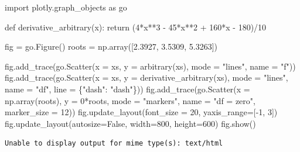 \documentclass[
  letterpaper,
  DIV=11,
  numbers=noendperiod]{scrreprt}
\newenvironment{Shaded}{\begin{snugshade}}{\end{snugshade}}
\newcommand{\ControlFlowTok}[1]{\textcolor[rgb]{0.00,0.23,0.31}{#1}}
\newcommand{\DecValTok}[1]{\textcolor[rgb]{0.68,0.00,0.00}{#1}}
\newcommand{\FloatTok}[1]{\textcolor[rgb]{0.68,0.00,0.00}{#1}}
\newcommand{\ImportTok}[1]{\textcolor[rgb]{0.00,0.46,0.62}{#1}}
\newcommand{\KeywordTok}[1]{\textcolor[rgb]{0.00,0.23,0.31}{#1}}
\newcommand{\NormalTok}[1]{\textcolor[rgb]{0.00,0.23,0.31}{#1}}
\newcommand{\OperatorTok}[1]{\textcolor[rgb]{0.37,0.37,0.37}{#1}}
\newcommand{\StringTok}[1]{\textcolor[rgb]{0.13,0.47,0.30}{#1}}
\newcommand{\VariableTok}[1]{\textcolor[rgb]{0.07,0.07,0.07}{#1}}
\begin{document}
\begin{Shaded}
\begin{Highlighting}[]
\ImportTok{import}\NormalTok{ plotly.graph\_objects }\ImportTok{as}\NormalTok{ go}

\KeywordTok{def}\NormalTok{ derivative\_arbitrary(x):}
    \ControlFlowTok{return}\NormalTok{ (}\DecValTok{4}\OperatorTok{*}\NormalTok{x}\OperatorTok{**}\DecValTok{3} \OperatorTok{{-}} \DecValTok{45}\OperatorTok{*}\NormalTok{x}\OperatorTok{**}\DecValTok{2} \OperatorTok{+} \DecValTok{160}\OperatorTok{*}\NormalTok{x }\OperatorTok{{-}} \DecValTok{180}\NormalTok{)}\OperatorTok{/}\DecValTok{10}

\NormalTok{fig }\OperatorTok{=}\NormalTok{ go.Figure()}
\NormalTok{roots }\OperatorTok{=}\NormalTok{ np.array([}\FloatTok{2.3927}\NormalTok{, }\FloatTok{3.5309}\NormalTok{, }\FloatTok{5.3263}\NormalTok{])}

\NormalTok{fig.add\_trace(go.Scatter(x }\OperatorTok{=}\NormalTok{ xs, y }\OperatorTok{=}\NormalTok{ arbitrary(xs), }
\NormalTok{                         mode }\OperatorTok{=} \StringTok{"lines"}\NormalTok{, name }\OperatorTok{=} \StringTok{"f"}\NormalTok{))}
\NormalTok{fig.add\_trace(go.Scatter(x }\OperatorTok{=}\NormalTok{ xs, y }\OperatorTok{=}\NormalTok{ derivative\_arbitrary(xs), }
\NormalTok{                         mode }\OperatorTok{=} \StringTok{"lines"}\NormalTok{, name }\OperatorTok{=} \StringTok{"df"}\NormalTok{, line }\OperatorTok{=}\NormalTok{ \{}\StringTok{"dash"}\NormalTok{: }\StringTok{"dash"}\NormalTok{\}))}
\NormalTok{fig.add\_trace(go.Scatter(x }\OperatorTok{=}\NormalTok{ np.array(roots), y }\OperatorTok{=} \DecValTok{0}\OperatorTok{*}\NormalTok{roots, }
\NormalTok{                         mode }\OperatorTok{=} \StringTok{"markers"}\NormalTok{, name }\OperatorTok{=} \StringTok{"df = zero"}\NormalTok{, marker\_size }\OperatorTok{=} \DecValTok{12}\NormalTok{))}
\NormalTok{fig.update\_layout(font\_size }\OperatorTok{=} \DecValTok{20}\NormalTok{, yaxis\_range}\OperatorTok{=}\NormalTok{[}\OperatorTok{{-}}\DecValTok{1}\NormalTok{, }\DecValTok{3}\NormalTok{])}
\NormalTok{fig.update\_layout(autosize}\OperatorTok{=}\VariableTok{False}\NormalTok{, width}\OperatorTok{=}\DecValTok{800}\NormalTok{, height}\OperatorTok{=}\DecValTok{600}\NormalTok{)}
\NormalTok{fig.show()}
\end{Highlighting}
\end{Shaded}

\begin{verbatim}
Unable to display output for mime type(s): text/html
\end{verbatim}
\end{document}
